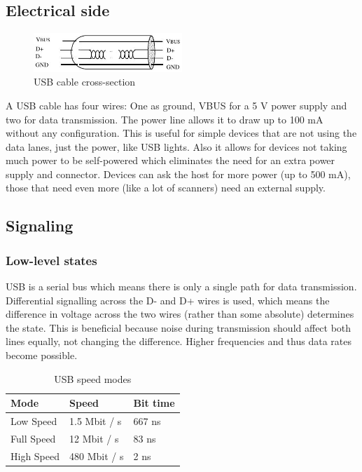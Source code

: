 \documentclass{article}
\begin{document}
\subsection{Electrical side}

\begin{figure}[!htbp]
  \caption{USB cable cross-section \cite[p. 17]{usbstd}}
  \centering
  \includegraphics[width=0.5\textwidth]{images/usb_cable.jpg}
\end{figure}

A USB cable has four wires: One as ground, VBUS for a 5 V power supply and two for data transmission.
The power line allows it to draw up to 100 mA without any configuration. This is useful for simple
devices that are not using the data lanes, just the power, like USB lights. Also it allows for devices
not taking much power to be self-powered which eliminates the need for an extra power supply and connector.
Devices can ask the host for more power (up to 500 mA), those that need even more (like a lot of scanners) need
an external supply. \cite[p. 17f.]{usbstd}

\subsection{Signaling}

\subsubsection{Low-level states}

USB is a serial bus which means there is only a single path for data transmission.
Differential signalling across the D- and D+ wires is used, which means the difference in voltage
across the two wires (rather than some absolute) determines the state. This is beneficial because
noise during transmission should affect both lines equally, not changing the difference.
Higher frequencies and thus data rates become possible.

\begin{table}[!htbp]
  \caption{USB speed modes \cite[p. 159]{usbstd}}
  \centering
  \begin{tabular}{l | l | l}
    Mode & Speed & Bit time \\ \hline
    Low Speed & 1.5 Mbit / s & 667 ns \\
    Full Speed & 12 Mbit / s & 83 ns \\
    High Speed & 480 Mbit / s & 2 ns \\
  \end{tabular}
\end{table}
\end{document}
